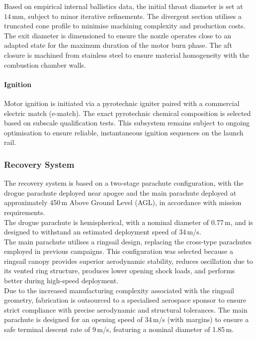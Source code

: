 \documentclass[11pt,a4paper]{article}
\begin{document}
Based on empirical internal ballistics data, the initial throat diameter is set at $14\,\text{mm}$, subject to minor iterative refinements. The divergent section utilises a truncated cone profile to minimise machining complexity and production costs. The exit diameter is dimensioned to ensure the nozzle operates close to an adapted state for the maximum duration of the motor burn phase. The aft closure is machined from stainless steel to ensure material homogeneity with the combustion chamber walls.\\

\paragraph{Ignition}
Motor ignition is initiated via a pyrotechnic igniter paired with a commercial electric match (e-match). The exact pyrotechnic chemical composition is selected based on subscale qualification tests. This subsystem remains subject to ongoing optimisation to ensure reliable, instantaneous ignition sequences on the launch rail.


\subsubsection{Recovery System}

The recovery system is based on a two-stage parachute configuration, with the drogue parachute deployed near apogee and the main parachute deployed at approximately 450\,m Above Ground Level (AGL), in accordance with mission requirements.\\

The drogue parachute is hemispherical, with a nominal diameter of 0.77\,m, and is designed to withstand an estimated deployment speed of 34\,m/s.\\

The main parachute utilises a ringsail design, replacing the cross-type parachutes employed in previous campaigns. This configuration was selected because a ringsail canopy provides superior aerodynamic stability, reduces oscillation due to its vented ring structure, produces lower opening shock loads, and performs better during high-speed deployment.\\ 

Due to the increased manufacturing complexity associated with the ringsail geometry, fabrication is outsourced to a specialised aerospace sponsor to ensure strict compliance with precise aerodynamic and structural tolerances. The main parachute is designed for an opening speed of 34\,m/s (with margins) to ensure a safe terminal descent rate of 9\,m/s, featuring a nominal diameter of 1.85\,m.\\
\end{document}
